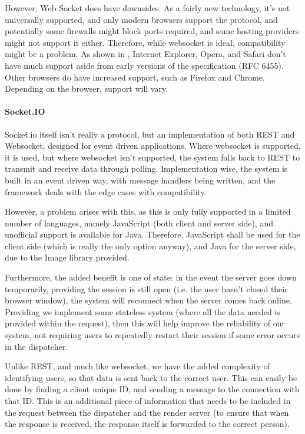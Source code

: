 \documentclass[10pt,a4paper]{article}
\begin{document}
However, Web Socket does have downsides. As a fairly new technology, it's not universally supported, and only modern browsers
support the protocol, and potentially some firewalls might block ports required, and some hosting providers might not support 
it either. Therefore, while websocket is ideal, compatibility might be a problem. As shown in \cite{WebSocketDeveloper},
Internet Explorer, Opera, and Safari don't have much support aside from early versions of the specification (RFC 6455). Other browsers
do have increased support, such as Firefox and Chrome. Depending on the browser, support will vary.

\paragraph{Socket.IO}
Socket.io itself isn't really a protocol, but an implementation of both REST and Websocket, designed for event driven
applications. Where websocket is supported, it is used, but where websocket isn't supported, the system falls back to
REST to transmit and receive data through polling. Implementation wise, the system is built in an event driven way,
with message handlers being written, and the framework deals with the edge cases with compatibility. \cite{SocketIOBook}

However, a problem arises with this, as this is only fully supported in a limited number of languages, namely JavaScript (both client
and server side), and unofficial support is available for Java. Therefore, JavaScript shall be used for the client side (which is really the only
option anyway), and Java for the server side, due to the Image library provided. 

Furthermore, the added benefit is one of state: in the event the server goes down temporarily, providing the session is still open (i.e. the user hasn't
closed their browser window), the system will reconnect when the server comes back online. Providing we implement some stateless system (where all the data
needed is provided within the request), then this will help improve the reliability of our system, not requiring users to repeatedly restart their session
if some error occurs in the dispatcher. 

Unlike REST, and much like websocket, we have the added complexity of identifying users, so that data is sent back to the correct user. This can easily be done
by finding a client unique ID, and sending a message to the connection with that ID. This is an additional piece of information that needs to be included in the request
between the dispatcher and the render server (to ensure that when the response is received, the response itself is forwarded to the correct person).
\end{document}
